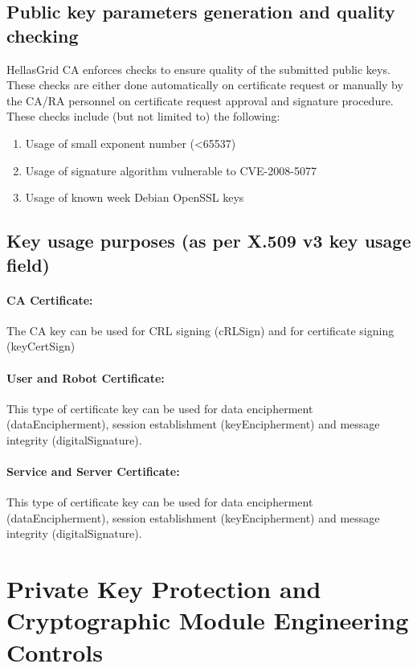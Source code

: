 \subsection{Public key parameters generation and quality checking}

HellasGrid CA enforces checks to ensure quality of the submitted public keys. These  checks are either done automatically on certificate request or manually by the CA/RA  personnel on certificate request approval and signature procedure. These checks include (but not limited to) the following:

\begin{enumerate}
\item{Usage of small exponent number (<65537)}
\item{Usage of signature algorithm vulnerable to CVE-2008-5077}
\item{Usage of known week Debian OpenSSL keys}
\end{enumerate}

\subsection{Key usage purposes (as per X.509 v3 key usage field)}

\paragraph{CA Certificate:} The CA key can be used for CRL signing (cRLSign) and for certificate signing (keyCertSign)

\paragraph{User and Robot Certificate:} This type of certificate key can be used for data  encipherment (dataEncipherment), session establishment (keyEncipherment) and message integrity (digitalSignature).

\paragraph{Service and Server Certificate:} This type of certificate key can be used for data  encipherment (dataEncipherment), session establishment (keyEncipherment) and message integrity (digitalSignature).

\section{Private Key Protection and Cryptographic Module Engineering Controls}
